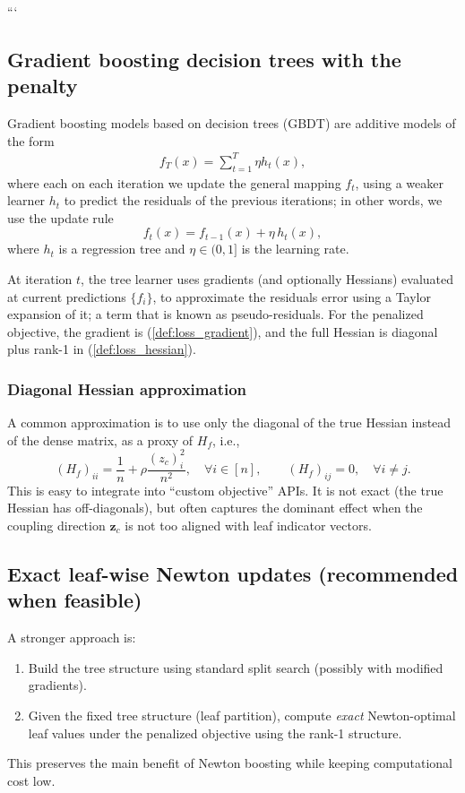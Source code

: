 \documentclass[11pt]{article}
\theoremstyle{plain}
\theoremstyle{definition}
\newcommand{\1}{\mathbf{1}}
\begin{document}
{\newpage
```



\newpage 




\subsection{Gradient boosting decision trees with the penalty}

Gradient boosting models based on decision trees (GBDT) are additive models of the form
\begin{align*}
    f_T(x) = \sum_{t=1}^T \eta h_t(x),
\end{align*}
where each on each iteration we update the general mapping $f_t$, using a weaker learner $h_t$ to predict the residuals of the previous iterations; in other words, we use the update rule
\[
f_{t}(x) = f_{t-1}(x) + \eta\, h_t(x),
\]
where \(h_t\) is a regression tree and \(\eta\in(0,1]\) is the learning rate.

At iteration \(t\), the tree learner uses gradients (and optionally Hessians) evaluated at current predictions \(\{f_i\}\), to approximate the residuals error using a Taylor expansion of it; a term that is known as  pseudo-residuals. For the penalized objective, the gradient is 
(\ref{def:loss_gradient}), and the full Hessian is diagonal plus rank-1 in (\ref{def:loss_hessian}).

\subsubsection{Diagonal Hessian approximation}
A common approximation is to use only the diagonal of the true Hessian instead of the dense matrix, as a proxy of $H_f$, i.e.,
\[
(H_f)_{ii} = \frac{1}{n} + \rho\frac{(z_{c})_i^2}{n^2}, \quad \forall i\in[n], \qquad 
(H_f)_{ij} = 0, \quad \forall i\neq j.
\]
This is easy to integrate into ``custom objective'' APIs. It is not exact (the true Hessian has off-diagonals), but often captures the dominant effect when the coupling direction \(\bm z_c\) is not too aligned with leaf indicator vectors.

\subsection{Exact leaf-wise Newton updates (recommended when feasible)}
A stronger approach is:
\begin{enumerate}[leftmargin=*]
\item Build the tree structure using standard split search (possibly with modified gradients).
\item Given the fixed tree structure (leaf partition), compute \emph{exact} Newton-optimal leaf values under the penalized objective using the rank-1 structure.
\end{enumerate}
This preserves the main benefit of Newton boosting while keeping computational cost low.

}
\end{document}
